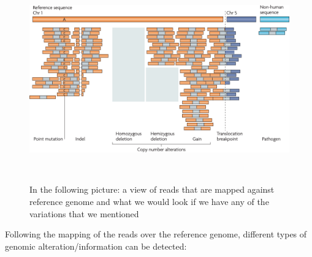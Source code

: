 \begin{figure}[H]
  \includegraphics[width=6.16003in,height=3.4875in]{image13.png}
  \centering
  \caption{In the following picture: a view of reads that are mapped against
  reference genome and what we would look if we have any of the variations that
  we mentioned}
\end{figure}

Following the mapping of the reads over the reference genome, different types of
genomic alteration/information can be detected:

